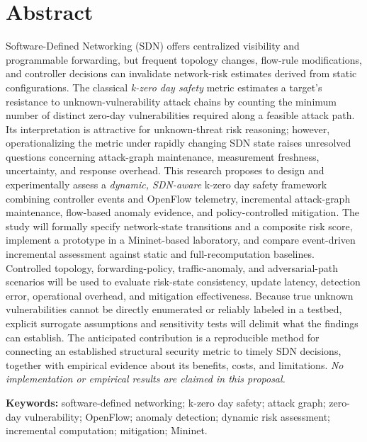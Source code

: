 \documentclass[12pt,a4paper,oneside]{article}
\begin{document}
\section*{Abstract}
Software-Defined Networking (SDN) offers centralized visibility and programmable forwarding, but frequent topology changes, flow-rule modifications, and controller decisions can invalidate network-risk estimates derived from static configurations. The classical \emph{k-zero day safety} metric estimates a target's resistance to unknown-vulnerability attack chains by counting the minimum number of distinct zero-day vulnerabilities required along a feasible attack path. Its interpretation is attractive for unknown-threat risk reasoning; however, operationalizing the metric under rapidly changing SDN state raises unresolved questions concerning attack-graph maintenance, measurement freshness, uncertainty, and response overhead. This research proposes to design and experimentally assess a \emph{dynamic, SDN-aware} k-zero day safety framework combining controller events and OpenFlow telemetry, incremental attack-graph maintenance, flow-based anomaly evidence, and policy-controlled mitigation. The study will formally specify network-state transitions and a composite risk score, implement a prototype in a Mininet-based laboratory, and compare event-driven incremental assessment against static and full-recomputation baselines. Controlled topology, forwarding-policy, traffic-anomaly, and adversarial-path scenarios will be used to evaluate risk-state consistency, update latency, detection error, operational overhead, and mitigation effectiveness. Because true unknown vulnerabilities cannot be directly enumerated or reliably labeled in a testbed, explicit surrogate assumptions and sensitivity tests will delimit what the findings can establish. The anticipated contribution is a reproducible method for connecting an established structural security metric to timely SDN decisions, together with empirical evidence about its benefits, costs, and limitations. \emph{No implementation or empirical results are claimed in this proposal.}

\noindent\textbf{Keywords:} software-defined networking; k-zero day safety; attack graph; zero-day vulnerability; OpenFlow; anomaly detection; dynamic risk assessment; incremental computation; mitigation; Mininet.

\clearpage
\tableofcontents
\clearpage
\listoffigures
\listoftables
\clearpage
{}
\end{document}
